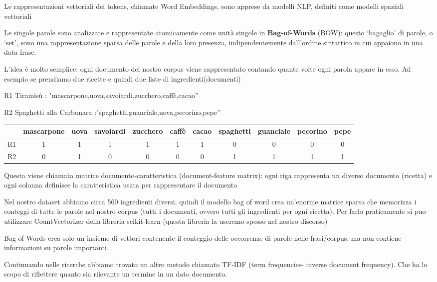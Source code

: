 \documentclass[12pt]{report}
\begin{document}
Le rappresentazioni vettoriali dei tokens, chiamate Word Embeddings, sono apprese da modelli NLP, definiti come modelli spaziali vettoriali

Le singole parole sono analizzate e rappresentate atomicamente come unità singole in 
\textbf{Bag-of-Words} (BOW): questo ‘bagaglio’ di parole, o ‘set’, sono una rappresentazione sparsa delle parole e della loro presenza, indipendentemente dall'ordine sintattico in cui appaiono in una data frase.

L'idea è molto semplice: ogni documento del nostro corpus viene rappresentato contando quante volte ogni parola appare in esso.
Ad esempio se prendiamo due ricette e quindi due liste di ingredienti(documenti) 

R1 Tiramisù : "mascarpone,uova,savoiardi,zucchero,caffè,cacao”

R2 Spaghetti alla Carbonara :"spaghetti,guanciale,uova,pecorino,pepe” 

\begin{center}
\begin{tabular}{|c|c|c|c|c|c|c|c|c|c|c} 
 \hline
 & mascarpone & uova & savoiardi & zucchero & caffè & cacao & spaghetti & guanciale & pecorino & pepe \\ [0.5ex] 
 \hline
R1  & 1 & 1 & 1 & 1 & 1 & 1 & 0 & 0 & 0 & 0\\
 \hline
R2  & 0 & 1 & 0 & 0 & 0 & 0 & 1 & 1 & 1 & 1\\
 \hline
\end{tabular}
\end{center}

Questa viene chiamata matrice documento-caratteristica (document-feature matrix): ogni riga rappresenta un diverso documento (ricetta) e ogni colonna definisce la caratteristica usata per rappresentare il documento

Nel nostro dataset abbiamo circa 560 ingredienti diversi, quindi il modello bag of word crea un'enorme matrice sparsa che memorizza i conteggi di tutte le parole nel nostro corpus (tutti i documenti, ovvero tutti gli ingredienti per ogni ricetta). Per farlo praticamente si puo utilizzare CountVectorizer della libreria scikit-learn (questa libreria la useremo spesso nel nostro discorso)

Bag of Words crea solo un insieme di vettori contenente il conteggio delle occorrenze di parole nelle frasi/corpus, ma non contiene informazioni su parole importanti.

Continuando nelle ricerche abbiamo trovato un altro metodo chiamato TF-IDF (term frequencies- inverse document frequency). Che ha lo scopo di riflettere quanto sia rilevante un termine in un dato documento.
\end{document}
